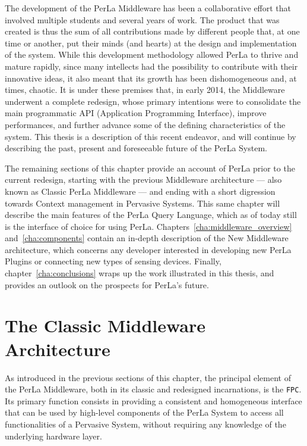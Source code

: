 The development of the PerLa Middleware has been a collaborative effort that
involved multiple students and several years of work. The product that was
created is thus the sum of all contributions made by different people that, at
one time or another, put their minds (and hearts) at the design and
implementation of the system. While this development methodology allowed PerLa
to thrive and mature rapidly, since many intellects had the possibility to
contribute with their innovative ideas, it also meant that its growth has been
dishomogeneous and, at times, chaotic. It is under these premises that, in
early 2014, the Middleware underwent a complete redesign, whose primary
intentions were to consolidate the main programmatic API (Application
Programming Interface), improve performances, and further advance some of the
defining characteristics of the system. This thesis is a description of this
recent endeavor, and will continue by describing the past, present and
foreseeable future of the PerLa System.

The remaining sections of this chapter provide an account of PerLa prior to the
current redesign, starting with the previous Middleware architecture --- also
known as Classic PerLa Middleware --- and ending with a short digression
towards Context management in Pervasive Systems. This same chapter will
describe the main features of the PerLa Query Language, which as of today still
is the interface of choice for using PerLa.
Chapters~\ref{cha:middleware_overview} and~\ref{cha:components} contain an
in-depth description of the New Middleware architecture, which concerns any
developer interested in developing new PerLa Plugins or connecting new types of
sensing devices. Finally, chapter~\ref{cha:conclusions} wraps up the work
illustrated in this thesis, and provides an outlook on the prospects for
PerLa's future.


\section{The Classic Middleware Architecture}

As introduced in the previous sections of this chapter, the principal element
of the PerLa Middleware, both in its classic and redesigned incarnations, is
the \texttt{FPC}. Its primary function consists in providing a consistent and
homogeneous interface that can be used by high-level components of the PerLa
System to access all functionalities of a Pervasive System, without requiring
any knowledge of the underlying hardware layer.

